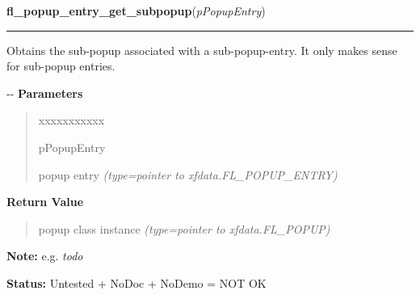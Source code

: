     \vspace{0.5ex}

\hspace{.8\funcindent}\begin{boxedminipage}{\funcwidth}

    \raggedright \textbf{fl\_popup\_entry\_get\_subpopup}(\textit{pPopupEntry})

    \vspace{-1.5ex}

    \rule{\textwidth}{0.5\fboxrule}
\setlength{\parskip}{2ex}

Obtains the sub-popup associated with a sub-popup-entry. It only
makes sense for sub-popup entries.

-{}-
\setlength{\parskip}{1ex}
      \textbf{Parameters}
      \vspace{-1ex}

      \begin{quote}
        \begin{Ventry}{xxxxxxxxxxx}

          \item[pPopupEntry]


popup entry
            {\it (type=pointer to xfdata.FL\_POPUP\_ENTRY)}

        \end{Ventry}

      \end{quote}

      \textbf{Return Value}
    \vspace{-1ex}

      \begin{quote}

popup class instance
      {\it (type=pointer to xfdata.FL\_POPUP)}

      \end{quote}

\textbf{Note:} 
e.g. \emph{todo}


\textbf{Status:} 
Untested + NoDoc + NoDemo = NOT OK


    \end{boxedminipage}

    \label{xformslib:flpopup:fl_popup_entry_set_subpopup}

    \vspace{0.5ex}

